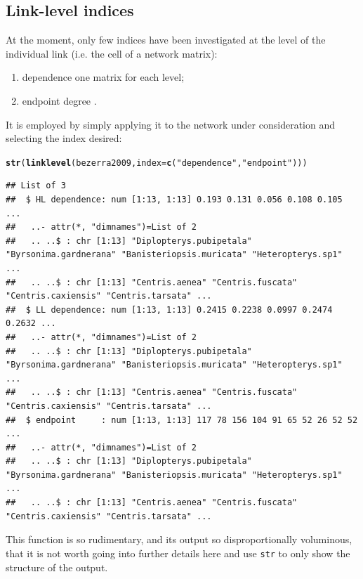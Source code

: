 \documentclass[a4paper, 11pt]{article}\usepackage[]{graphicx}\usepackage[dvipsnames]{xcolor}
\makeatletter
\newcommand{\hlstr}[1]{\textcolor[rgb]{0.192,0.494,0.8}{#1}}%
\newcommand{\hlstd}[1]{\textcolor[rgb]{0.345,0.345,0.345}{#1}}%
\newcommand{\hlkwc}[1]{\textcolor[rgb]{0.333,0.667,0.333}{#1}}%
\newcommand{\hlkwd}[1]{\textcolor[rgb]{0.737,0.353,0.396}{\textbf{#1}}}%
\newenvironment{kframe}{%
 \def\at@end@of@kframe{}%
 \ifinner\ifhmode%
  \def\at@end@of@kframe{\end{minipage}}%
  \begin{minipage}{\columnwidth}%
 \fi\fi%
 \def\FrameCommand##1{\hskip\@totalleftmargin \hskip-\fboxsep
 \colorbox{shadecolor}{##1}\hskip-\fboxsep
     \hskip-\linewidth \hskip-\@totalleftmargin \hskip\columnwidth}%
 \MakeFramed {\advance\hsize-\width
   \@totalleftmargin\z@ \linewidth\hsize
   \@setminipage}}%
 {\par\unskip\endMakeFramed%
 \at@end@of@kframe}
\newenvironment{knitrout}{}{} %
\makeatother
\begin{document}
\subsection{Link-level indices}\label{linklevel}
At the moment, only few indices have been investigated at the level of the individual link (i.e. the cell of a network matrix):
\begin{enumerate}
\item dependence \citep[i.e. the relevance of each species for the other level:][]{Bascompte2006} one matrix for each level;
\item endpoint degree \citep[i.e. product of degrees of species linked by this cell:][]{Barrat2004}.
\end{enumerate}
It is employed by simply applying it to the network under consideration and selecting the index desired:
\begin{knitrout}
\color{fgcolor}\begin{kframe}
\begin{alltt}
\hlkwd{str}\hlstd{(}\hlkwd{linklevel}\hlstd{(bezerra2009,} \hlkwc{index}\hlstd{=}\hlkwd{c}\hlstd{(}\hlstr{"dependence"}\hlstd{,} \hlstr{"endpoint"}\hlstd{)))}
\end{alltt}
\begin{verbatim}
## List of 3
##  $ HL dependence: num [1:13, 1:13] 0.193 0.131 0.056 0.108 0.105 ...
##   ..- attr(*, "dimnames")=List of 2
##   .. ..$ : chr [1:13] "Diplopterys.pubipetala" "Byrsonima.gardnerana" "Banisteriopsis.muricata" "Heteropterys.sp1" ...
##   .. ..$ : chr [1:13] "Centris.aenea" "Centris.fuscata" "Centris.caxiensis" "Centris.tarsata" ...
##  $ LL dependence: num [1:13, 1:13] 0.2415 0.2238 0.0997 0.2474 0.2632 ...
##   ..- attr(*, "dimnames")=List of 2
##   .. ..$ : chr [1:13] "Diplopterys.pubipetala" "Byrsonima.gardnerana" "Banisteriopsis.muricata" "Heteropterys.sp1" ...
##   .. ..$ : chr [1:13] "Centris.aenea" "Centris.fuscata" "Centris.caxiensis" "Centris.tarsata" ...
##  $ endpoint     : num [1:13, 1:13] 117 78 156 104 91 65 52 26 52 52 ...
##   ..- attr(*, "dimnames")=List of 2
##   .. ..$ : chr [1:13] "Diplopterys.pubipetala" "Byrsonima.gardnerana" "Banisteriopsis.muricata" "Heteropterys.sp1" ...
##   .. ..$ : chr [1:13] "Centris.aenea" "Centris.fuscata" "Centris.caxiensis" "Centris.tarsata" ...
\end{verbatim}
\end{kframe}
\end{knitrout}
This function is so rudimentary, and its output so disproportionally voluminous, that it is not worth going into further details here and use \texttt{str} to only show the structure of the output.
\end{document}
